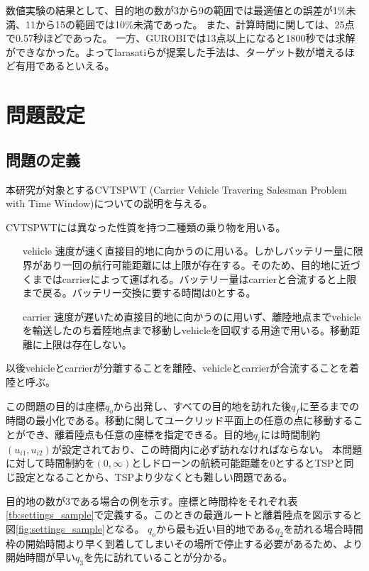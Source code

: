 \documentclass[11pt,a4paper,dvipdfmx,titlepage,uplatex]{jsarticle}
\theoremstyle{mystyle}
\newcommand{\0}{\mathbf{0}}
\begin{document}
	数値実験の結果\cite{larasati2022integrated}として、目的地の数が3から9の範囲では最適値との誤差が1\%未満、11から15の範囲では10\%未満であった。
	また、計算時間に関しては、25点で0.57秒ほどであった。
	一方、GUROBIでは13点以上になると1800秒では求解ができなかった。よってlarasatiらが提案した手法は、ターゲット数が増えるほど有用であるといえる。
	
	\clearpage
	\section{問題設定}\label{sec:Second_Order_Cone_Programming_without_interiorpoint}
	\subsection{問題の定義}\label{sec:problem_settings}
	本研究が対象とするCVTSPWT (Carrier Vehicle Travering Salesman Problem with Time Window)についての説明を与える。
	
	CVTSPWTには異なった性質を持つ二種類の乗り物を用いる。
	\begin{itemize}
		\item[vehicle] 速度が速く直接目的地に向かうのに用いる。しかしバッテリー量に限界があり一回の航行可能距離には上限が存在する。そのため、目的地に近づくまではcarrierによって運ばれる。バッテリー量はcarrierと合流すると上限まで戻る。バッテリー交換に要する時間は0とする。
		\item[carrier] 速度が遅いため直接目的地に向かうのに用いず、離陸地点までvehicleを輸送したのち着陸地点まで移動しvehicleを回収する用途で用いる。移動距離に上限は存在しない。
	\end{itemize}
	以後vehicleとcarrierが分離することを離陸、vehicleとcarrierが合流することを着陸と呼ぶ。
	
	この問題の目的は座標$q_o$から出発し、すべての目的地を訪れた後$q_f$に至るまでの時間の最小化である。移動に関してユークリッド平面上の任意の点に移動することができ、離着陸点も任意の座標を指定できる。目的地$q_i$には時間制約$(u_{i1}, u_{i2})$が設定されており、この時間内に必ず訪れなければならない。
	本問題に対して時間制約を$(0,\infty)$としドローンの航続可能距離を0とするとTSPと同じ設定となることから、TSPより少なくとも難しい問題である。
	
	目的地の数が3である場合の例を示す。座標と時間枠をそれぞれ表\ref{tb:settings_sample}で定義する。このときの最適ルートと離着陸点を図示すると図\ref{fig:settings_sample}となる。
	$q_o$から最も近い目的地である$q_2$を訪れる場合時間枠の開始時間より早く到着してしまいその場所で停止する必要があるため、より開始時間が早い$q_3$を先に訪れていることが分かる。
	
\end{document}
